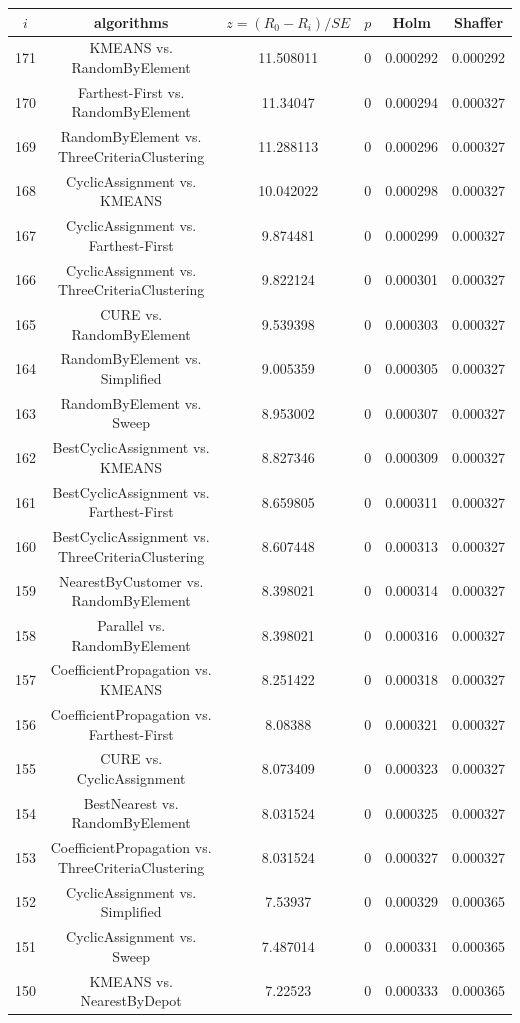 \documentclass[a4paper,10pt]{article}
\begin{document}
\begin{landscape}
\begin{table}[!htp]
\centering\scriptsize
\begin{tabular}{cccccc}
$i$&algorithms&$z=(R_0 - R_i)/SE$&$p$&Holm&Shaffer\\
\hline171&KMEANS vs. RandomByElement&11.508011&0&0.000292&0.000292\\
170&Farthest-First vs. RandomByElement&11.34047&0&0.000294&0.000327\\
169&RandomByElement vs. ThreeCriteriaClustering&11.288113&0&0.000296&0.000327\\
168&CyclicAssignment vs. KMEANS&10.042022&0&0.000298&0.000327\\
167&CyclicAssignment vs. Farthest-First&9.874481&0&0.000299&0.000327\\
166&CyclicAssignment vs. ThreeCriteriaClustering&9.822124&0&0.000301&0.000327\\
165&CURE vs. RandomByElement&9.539398&0&0.000303&0.000327\\
164&RandomByElement vs. Simplified&9.005359&0&0.000305&0.000327\\
163&RandomByElement vs. Sweep&8.953002&0&0.000307&0.000327\\
162&BestCyclicAssignment vs. KMEANS&8.827346&0&0.000309&0.000327\\
161&BestCyclicAssignment vs. Farthest-First&8.659805&0&0.000311&0.000327\\
160&BestCyclicAssignment vs. ThreeCriteriaClustering&8.607448&0&0.000313&0.000327\\
159&NearestByCustomer vs. RandomByElement&8.398021&0&0.000314&0.000327\\
158&Parallel vs. RandomByElement&8.398021&0&0.000316&0.000327\\
157&CoefficientPropagation vs. KMEANS&8.251422&0&0.000318&0.000327\\
156&CoefficientPropagation vs. Farthest-First&8.08388&0&0.000321&0.000327\\
155&CURE vs. CyclicAssignment&8.073409&0&0.000323&0.000327\\
154&BestNearest vs. RandomByElement&8.031524&0&0.000325&0.000327\\
153&CoefficientPropagation vs. ThreeCriteriaClustering&8.031524&0&0.000327&0.000327\\
152&CyclicAssignment vs. Simplified&7.53937&0&0.000329&0.000365\\
151&CyclicAssignment vs. Sweep&7.487014&0&0.000331&0.000365\\
150&KMEANS vs. NearestByDepot&7.22523&0&0.000333&0.000365\\

\end{tabular}
\end{table}
\end{landscape}
\end{document}
